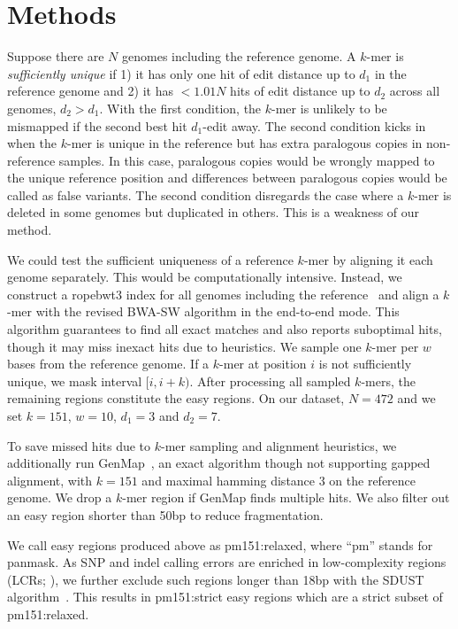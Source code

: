 \documentclass[webpdf,contemporary,large,namedate]{oup-authoring-template}%
\begin{document}
\section{Methods}

Suppose there are $N$ genomes including the reference genome.
A $k$-mer is \emph{sufficiently unique}
if 1) it has only one hit of edit distance up to $d_1$ in the reference genome
and 2) it has $<1.01N$ hits of edit distance up to $d_2$ across all genomes, $d_2>d_1$.
With the first condition, the $k$-mer is unlikely to be mismapped if the second best hit $d_1$-edit away.
The second condition kicks in when the $k$-mer is unique in the reference but has extra paralogous copies in non-reference samples.
In this case, paralogous copies would be wrongly mapped to the unique reference position and
differences between paralogous copies would be called as false variants.
The second condition disregards the case where a $k$-mer is deleted in some genomes but duplicated in others.
This is a weakness of our method.

We could test the sufficient uniqueness of a reference $k$-mer by aligning it each genome separately.
This would be computationally intensive.
Instead, we construct a ropebwt3 index for all genomes including the reference~\citep{Li:2024ac}
and align a $k$-mer with the revised BWA-SW algorithm in the end-to-end mode.
This algorithm guarantees to find all exact matches and also reports suboptimal hits,
though it may miss inexact hits due to heuristics.
We sample one $k$-mer per $w$ bases from the reference genome.
If a $k$-mer at position $i$ is not sufficiently unique, we mask interval $[i,i+k)$.
After processing all sampled $k$-mers, the remaining regions constitute the easy regions.
On our dataset, $N=472$ and we set $k=151$, $w=10$, $d_1=3$ and $d_2=7$.

To save missed hits due to $k$-mer sampling and alignment heuristics,
we additionally run GenMap~\citep{Pockrandt:2020aa}, an exact algorithm though not supporting gapped alignment, with $k=151$ and maximal hamming distance 3 on the reference genome.
We drop a $k$-mer region if GenMap finds multiple hits.
We also filter out an easy region shorter than 50bp to reduce fragmentation.

We call easy regions produced above as {\sf pm151:relaxed}, where ``pm'' stands for panmask.
As SNP and indel calling errors are enriched in low-complexity regions (LCRs; \citealp{Li:2014aa}),
we further exclude such regions longer than 18bp with the SDUST algorithm~\citep{Morgulis:2006aa}.
This results in {\sf pm151:strict} easy regions which are a strict subset of {\sf pm151:relaxed}.
\end{document}
